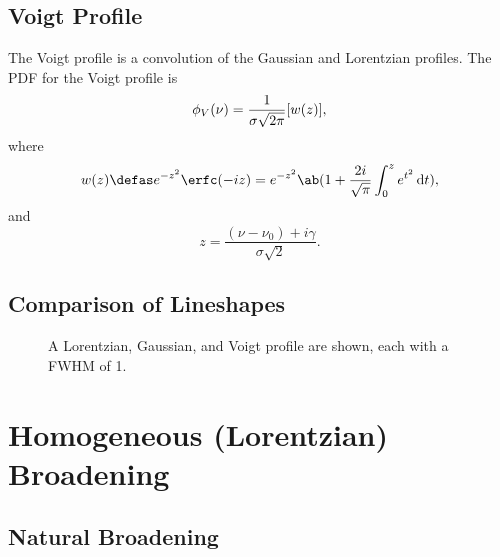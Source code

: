 \subsection{Voigt Profile}

The Voigt profile is a convolution of the Gaussian and Lorentzian profiles.
The PDF for the Voigt profile is
\begin{equation*}
    \phi_V(\nu) = \frac{1}{\sigma\sqrt{2\pi}}\real[w(z)],
\end{equation*}
where
\begin{equation*}
    w(z) \defas e^{-z^2}\erfc(-iz) = e^{-z^2}\ab(1 + \frac{2i}{\sqrt{\pi}}\int_0^z e^{t^2} \odif{t}),
\end{equation*}
and
\begin{equation*}
    z = \frac{(\nu - \nu_0) + i\gamma}{\sigma\sqrt{2}}.
\end{equation*}

\subsection{Comparison of Lineshapes}

\begin{figure}[H]
    \centering
    \caption{A Lorentzian, Gaussian, and Voigt profile are shown, each with a FWHM of 1.}
\end{figure}

\section{Homogeneous (Lorentzian) Broadening}

\subsection{Natural Broadening}

